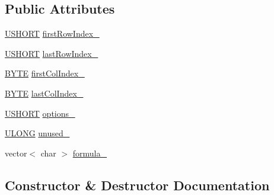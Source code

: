\subsection*{Public Attributes}
\begin{DoxyCompactItemize}
\item 
\hyperlink{_basic_excel_8hpp_a5850d5316caf7f4cedd742fdf8cd7c02}{U\+S\+H\+O\+R\+T} \hyperlink{struct_y_excel_1_1_worksheet_1_1_cell_table_1_1_row_block_1_1_cell_block_1_1_formula_1_1_array_a87e03eb0c24d9d09cf596c15f696af5f}{first\+Row\+Index\+\_\+}
\item 
\hyperlink{_basic_excel_8hpp_a5850d5316caf7f4cedd742fdf8cd7c02}{U\+S\+H\+O\+R\+T} \hyperlink{struct_y_excel_1_1_worksheet_1_1_cell_table_1_1_row_block_1_1_cell_block_1_1_formula_1_1_array_a3c1446083f4e72f9b4271bca90f25287}{last\+Row\+Index\+\_\+}
\item 
\hyperlink{_basic_excel_8hpp_a4ae1dab0fb4b072a66584546209e7d58}{B\+Y\+T\+E} \hyperlink{struct_y_excel_1_1_worksheet_1_1_cell_table_1_1_row_block_1_1_cell_block_1_1_formula_1_1_array_a402e37160a6395e2378a0c57ad78c931}{first\+Col\+Index\+\_\+}
\item 
\hyperlink{_basic_excel_8hpp_a4ae1dab0fb4b072a66584546209e7d58}{B\+Y\+T\+E} \hyperlink{struct_y_excel_1_1_worksheet_1_1_cell_table_1_1_row_block_1_1_cell_block_1_1_formula_1_1_array_a6e8be0edbbabb73a5237198249d41815}{last\+Col\+Index\+\_\+}
\item 
\hyperlink{_basic_excel_8hpp_a5850d5316caf7f4cedd742fdf8cd7c02}{U\+S\+H\+O\+R\+T} \hyperlink{struct_y_excel_1_1_worksheet_1_1_cell_table_1_1_row_block_1_1_cell_block_1_1_formula_1_1_array_a61ab5bb71f6f932fd6ec7b3f656dc8be}{options\+\_\+}
\item 
\hyperlink{_basic_excel_8hpp_abe09d1bea023be6a07cbadde8e955435}{U\+L\+O\+N\+G} \hyperlink{struct_y_excel_1_1_worksheet_1_1_cell_table_1_1_row_block_1_1_cell_block_1_1_formula_1_1_array_a692dd44c10d61d34b30d2f4d726de41a}{unused\+\_\+}
\item 
vector$<$ char $>$ \hyperlink{struct_y_excel_1_1_worksheet_1_1_cell_table_1_1_row_block_1_1_cell_block_1_1_formula_1_1_array_a4c07cd7e4b14eddee6d5fbca8a4a30f9}{formula\+\_\+}
\end{DoxyCompactItemize}


\subsection{Constructor \& Destructor Documentation}
\hypertarget{struct_y_excel_1_1_worksheet_1_1_cell_table_1_1_row_block_1_1_cell_block_1_1_formula_1_1_array_a821aeb10dd2455ad7c1d2731dc38ce5c}{}
